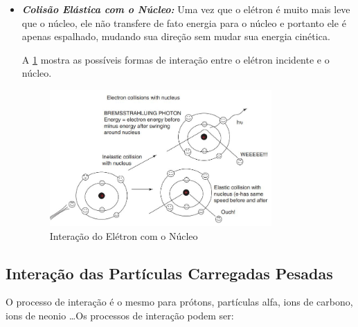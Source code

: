 \documentclass[11pt,a4paper]{article}
\begin{document}
\begin{itemize}
		A energia perdida através de radiação e a produção radiativa $g$ aumenta diretamente com o número atômico Z do material absorvedor e com a energia cinética dos elétrons. A produção radiativa para alvos de raios-x na faixa de energia do radiodiagnóstico (~ 100 keV) é da ordem de 1\%, enquanto que a produção radiativa na faixe de energia de radioterapia é da ordem de ~ 10\% até ~ 20\%. 

		\item \textbf{\textit{\textcolor{CarnationPink}{Colisão Elástica com o Núcleo}:}} Uma vez que o elétron é muito mais leve que o núcleo, ele não transfere de fato energia para o núcleo e portanto ele é apenas espalhado, mudando sua direção sem mudar sua energia cinética. 
		
		A \ref{fig:interacaoEletronNucleo} mostra as possíveis formas de interação entre o elétron incidente e o núcleo.

		\begin{figure}[h]
			\centering
			\includegraphics[width=0.8\textwidth]{Imagens/interacaoEletronNucleo.JPG}
			\caption{Interação do Elétron com o Núcleo}
			\label{fig:interacaoEletronNucleo}                
		\end{figure}

		
	\end{itemize}        

\subsection*{Interação das Partículas Carregadas Pesadas}

    O processo de interação é o mesmo para prótons, partículas alfa, ions de carbono, ions de neonio \dots Os processos de interação podem ser:
\end{document}
